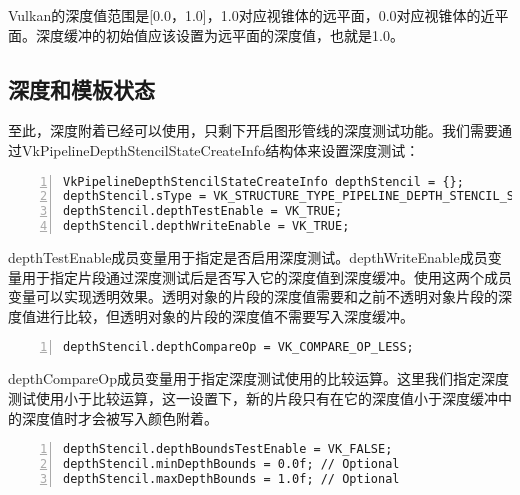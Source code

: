 \documentclass{ctexart}
\begin{document}
Vulkan的深度值范围是[0.0，1.0]，1.0对应视锥体的远平面，0.0对应视锥体的近平面。深度缓冲的初始值应该设置为远平面的深度值，也就是1.0。

\subsection{深度和模板状态}

至此，深度附着已经可以使用，只剩下开启图形管线的深度测试功能。我们需要通过VkPipelineDepthStencilStateCreateInfo结构体来设置深度测试：

\begin{lstlisting}[language={[ANSI]C},keywordstyle=\color{blue!70},commentstyle=\color{red!50!green!50!blue!50},frame=shadowbox, rulesepcolor=\color{red!20!green!20!blue!20},basicstyle=\small,numbers=left, numberstyle=\tiny,breaklines=true]
VkPipelineDepthStencilStateCreateInfo depthStencil = {};
depthStencil.sType = VK_STRUCTURE_TYPE_PIPELINE_DEPTH_STENCIL_STATE_CREATE_INFO;
depthStencil.depthTestEnable = VK_TRUE;
depthStencil.depthWriteEnable = VK_TRUE;
\end{lstlisting}

depthTestEnable成员变量用于指定是否启用深度测试。depthWriteEnable成员变量用于指定片段通过深度测试后是否写入它的深度值到深度缓冲。使用这两个成员变量可以实现透明效果。透明对象的片段的深度值需要和之前不透明对象片段的深度值进行比较，但透明对象的片段的深度值不需要写入深度缓冲。

\begin{lstlisting}[language={[ANSI]C},keywordstyle=\color{blue!70},commentstyle=\color{red!50!green!50!blue!50},frame=shadowbox, rulesepcolor=\color{red!20!green!20!blue!20},basicstyle=\small,numbers=left, numberstyle=\tiny,breaklines=true]
depthStencil.depthCompareOp = VK_COMPARE_OP_LESS;
\end{lstlisting}

depthCompareOp成员变量用于指定深度测试使用的比较运算。这里我们指定深度测试使用小于比较运算，这一设置下，新的片段只有在它的深度值小于深度缓冲中的深度值时才会被写入颜色附着。

\begin{lstlisting}[language={[ANSI]C},keywordstyle=\color{blue!70},commentstyle=\color{red!50!green!50!blue!50},frame=shadowbox, rulesepcolor=\color{red!20!green!20!blue!20},basicstyle=\small,numbers=left, numberstyle=\tiny,breaklines=true]
depthStencil.depthBoundsTestEnable = VK_FALSE;
depthStencil.minDepthBounds = 0.0f; // Optional
depthStencil.maxDepthBounds = 1.0f; // Optional
\end{lstlisting}
\end{document}
